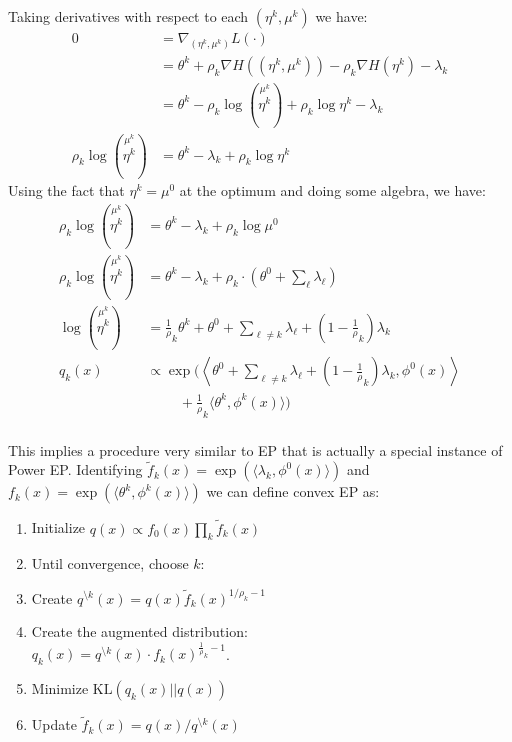 \documentclass[times, 10pt,twocolumn]{article}
\newcommand{\bs}[0]{\textrm{\textbackslash}}
\begin{document}
Taking derivatives with respect to each $(\eta^k,\mu^k)$ we have:
\begin{equation*}
  \begin{split}
    0 &= \nabla_{(\eta^k,\mu^k)} L(\cdot) \\
    &= \theta^k + \rho_k \nabla H\left((\eta^k,\mu^k)\right) - \rho_k \nabla
    H(\eta^k) -\lambda_k \\
    &= \theta^k  - \rho_k \log \left (\stackrel{\mu^k}{\eta^k}\right) +
  \rho_k   \log \eta^k  - \lambda_k \\
   \rho_k   \log \left (\stackrel{\mu^k}{\eta^k}\right)&= \theta^k  -
    \lambda_k + \rho_k \log \eta^k
   \end{split}
 \end{equation*}
Using the fact that $\eta^k = \mu^0$ at the optimum and doing
some algebra, we have:
\begin{equation*}
  \begin{split}
    \rho_k \log \left (\stackrel{\mu^k}{\eta^k}\right)&= \theta^k  -
    \lambda_k + \rho_k \log \mu^0 \\
    \rho_k \log \left (\stackrel{\mu^k}{\eta^k}\right)&= \theta^k  -
    \lambda_k + \rho_k \cdot ( \theta^0  + \sum_\ell \lambda_\ell) \\
    \log \left (\stackrel{\mu^k}{\eta^k}\right)&=  \frac1\rho_k
    \theta^k  + \theta^0  + \sum_{\ell \ne k} \lambda_\ell  +
    (1-\frac 1\rho_k)\lambda_k\\
    q_k(x) & \propto \exp(\left \langle \theta^0  + \sum_{\ell \ne
    k}\lambda_\ell + (1-\frac 1\rho_k)\lambda_k , \phi^0(x)
    \right\rangle\\ &\phantom{\cdots\cdots\cdots} + \frac1\rho_k \langle \theta^k,\phi^k(x)
    \rangle )\\
   \end{split}
 \end{equation*}

This implies a procedure very similar to EP that is actually a
special instance of Power EP\cite{minka2004}.  Identifying $\tilde f_k(x) =
\exp(\langle\lambda_k,\phi^0(x)\rangle)$ and $f_k(x) =
\exp(\langle\theta^k,\phi^k(x)\rangle)$ we can define convex EP as:
\begin{enumerate}
  \item Initialize $q(x) \propto f_0(x) \prod_k \tilde f_k(x)$
  \item Until convergence, choose $k$:
  \item Create $q^{\bs k}(x) = q(x)\tilde f_k(x)^{1/\rho_k - 1}$
  \item Create the augmented distribution:\\
    $q_k(x) = q^{\bs k}(x)\cdot f_k(x)^{\frac1\rho_k - 1}$.
  \item Minimize $\mathrm{KL}\left (q_k(x) || q(x)\right)$
  \item Update $\tilde f_k(x) = q(x)/q^{\bs k}(x)$
\end{enumerate}
\end{document}
